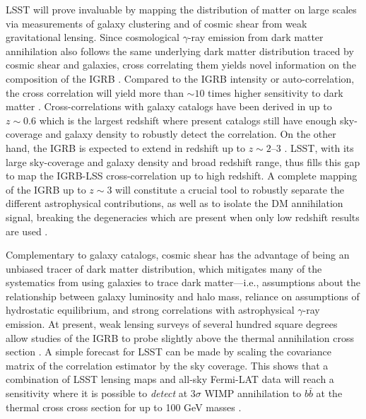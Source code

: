 LSST will prove invaluable by mapping the distribution of matter on large scales via measurements of galaxy clustering and of cosmic shear from weak gravitational lensing. 
Since  cosmological $\gamma$-ray emission from dark matter annihilation also follows the same underlying dark matter distribution traced by cosmic shear and galaxies, cross correlating them yields novel information on the composition of the IGRB \citep{1212.5018,1411.4651,1506.01030,Lisanti:2018,1312.4403}. 
Compared to the IGRB intensity or auto-correlation, the cross correlation will yield more than $\sim 10$ times higher sensitivity to dark matter \citep{1411.4651,1503.05922}.
Cross-correlations with galaxy catalogs have been derived in \cite{1709.01940,1503.05918,1103.4861} up to  $z\sim 0.6$ 
which is the largest redshift where present  catalogs still have enough sky-coverage and galaxy density to robustly
detect the correlation.  On the other hand, the IGRB is expected to extend in redshift  up to $z\sim 2$--$3$ \citep{1502.02866}. 
LSST, with its large sky-coverage and galaxy density and broad redshift range, thus fills this gap to map the IGRB-LSS cross-correlation up to high redshift. 
A complete mapping of the IGRB up to $z\sim3$ will constitute a crucial tool to robustly separate the different 
astrophysical contributions, as well as to isolate the DM annihilation signal, breaking the degeneracies which
are present when only low redshift results are used \citep{1506.01030}.    



Complementary to galaxy catalogs, cosmic shear has the advantage of being an unbiased tracer of dark matter distribution, which mitigates many of the systematics from using galaxies to trace dark matter---i.e., assumptions about the relationship between galaxy luminosity and halo mass, reliance on assumptions of hydrostatic equilibrium, and strong correlations with astrophysical $\gamma$-ray emission. At present, weak lensing surveys of several hundred square degrees allow studies of the IGRB to probe slightly above the thermal annihilation cross section \citep{1404.5503,1607.02187,1611.03554}. A simple forecast for LSST can be made by scaling the covariance matrix of the correlation estimator by the sky coverage. This shows that a combination of LSST lensing maps and all-sky Fermi-LAT data will reach a sensitivity where it is possible to \textit{detect} at $3\sigma$ WIMP annihilation to $b\bar{b}$ at the thermal cross cross section for up to 100 GeV masses \citep{1404.5503}.   

